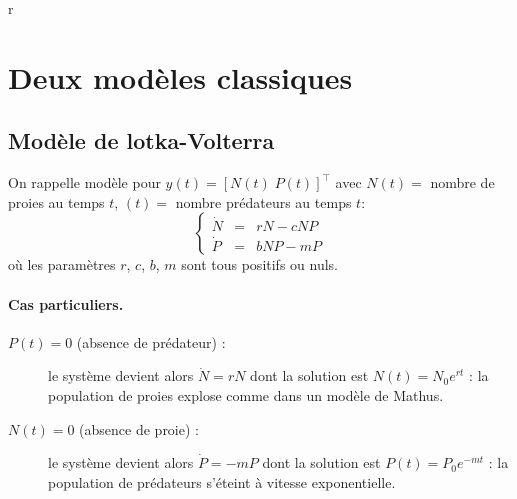 r%
\section{Deux modèles classiques}


\subsection{Modèle de lotka-Volterra}

On rappelle modèle pour $y(t) = [N(t) \; P(t)]^\top$ avec $N(t) =$ nombre de proies au temps $t$, $(t) = $ nombre prédateurs au temps $t$:
$$
\left\{ \begin{array}{rcl} 
  \dot N & = & r N - c N P \\
  \dot P & = & b N P  - m P
\end{array} \right.
$$
où les paramètres $r$, $c$, $b$, $m$ sont tous positifs ou nuls.

\paragraph{Cas particuliers.}
\begin{description}
  \item[$P(t) = 0 $ (absence de prédateur) :] le système devient alors $\dot N = r N$ dont la solution est $N(t) = N_0 e^{rt}$ : la population de proies explose comme dans un modèle de Mathus.
  \item[$N(t) = 0 $ (absence de proie) :] le système devient alors $\dot P = - m P$ dont la solution est $P(t) = P_0 e^{-mt}$ : la population de prédateurs s'éteint à vitesse exponentielle.
\end{description}

